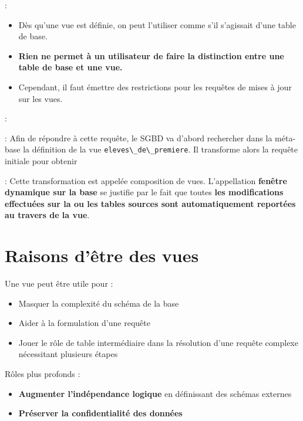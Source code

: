\documentclass[10pt]{beamer}
\begin{document}
\begin{frame}{\secname : \subsecname}
    \begin{itemize}
        \item Dès qu'une vue est définie, on peut l'utiliser comme s'il s'agissait d'une table de base.
        \item \textbf{Rien ne permet à un utilisateur de faire la distinction entre une table de base et une vue.}
        \item Cependant, il faut émettre des restrictions pour les requêtes de mises à jour sur les vues.
    \end{itemize}
\end{frame}
\begin{frame}{\secname : \subsecname}
    
\end{frame}

\begin{frame}{\secname : \subsecname}
    Afin de répondre à cette requête, le SGBD va d'abord rechercher dans la méta-base la définition de la vue \lstinline[language=sql]!eleves\_de\_premiere!.  Il transforme alors la requête initiale pour obtenir
    
\end{frame}

\begin{frame}{\secname : \subsecname}
    Cette transformation est appelée composition de vues.
    L'appellation \textbf{fenêtre dynamique sur la base} se justifie par le fait que toutes \textbf{les modifications effectuées sur la ou les tables sources sont automatiquement reportées au travers de la vue}.
\end{frame}

\section{Raisons d'être des vues}
\begin{frame}{\secname}
    Une vue peut être utile pour :
    \begin{itemize}
        \item Masquer la complexité du schéma de la base
        \item Aider à la formulation d'une requête
        \item Jouer le rôle de table intermédiaire dans la résolution d'une requête complexe nécessitant plusieurs étapes
    \end{itemize}
    Rôles plus profonds :
    \begin{itemize}
        \item \textbf{Augmenter l'indépendance logique} en définissant des schémas externes
        \item \textbf{Préserver la confidentialité des données}
    \end{itemize}
\end{frame}
\end{document}
